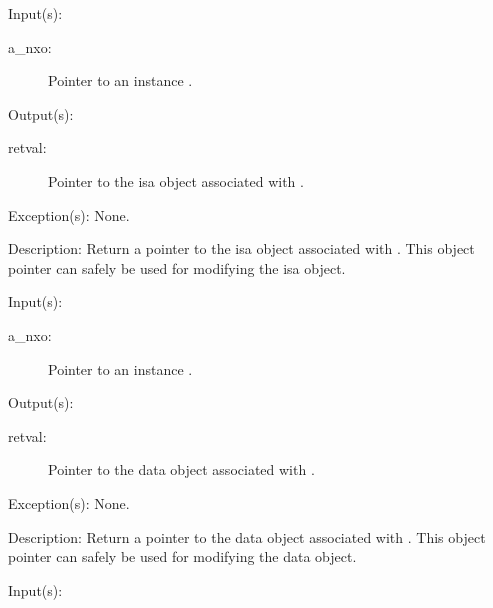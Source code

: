 \begin{capi}
	\begin{capilist}
	\item[Input(s): ]
		\begin{description}\item[]
		\item[a\_nxo: ]
			Pointer to an instance .
		\end{description}
	\item[Output(s): ]
		\begin{description}\item[]
		\item[retval: ]
			Pointer to the isa object associated with .
		\end{description}
	\item[Exception(s): ] None.
	\item[Description: ]
		Return a pointer to the isa object associated with
		.  This object pointer can safely be used for
		modifying the isa object.
	\end{capilist}
\label{nxo_instance_data_get}
	\begin{capilist}
	\item[Input(s): ]
		\begin{description}\item[]
		\item[a\_nxo: ]
			Pointer to an instance \classname{nxo}.
		\end{description}
	\item[Output(s): ]
		\begin{description}\item[]
		\item[retval: ]
			Pointer to the data object associated with
			\cvar{a\_nxo}.
		\end{description}
	\item[Exception(s): ] None.
	\item[Description: ]
		Return a pointer to the data object associated with
		.  This object pointer can safely be used for
		modifying the data object.
	\end{capilist}
\label{nxo_instance_opaque_get}
	\begin{capilist}
	\item[Input(s): ]

\end{capilist}
\end{capi}
